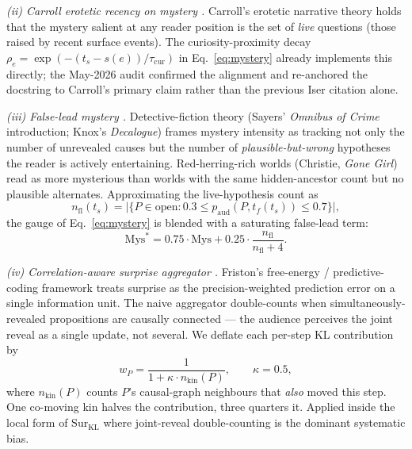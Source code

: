 \documentclass[11pt]{article}
\begin{document}
\emph{(ii) Carroll erotetic recency on mystery
\citep{carroll1990philosophy}.} Carroll's erotetic narrative
theory holds that the mystery salient at any reader position
is the set of \emph{live} questions (those raised by recent
surface events). The curiosity-proximity decay
$\rho_e = \exp(-(t_s - s(e))/\tau_{\mathrm{cur}})$ in
Eq.~\ref{eq:mystery} already implements this directly; the
May-2026 audit confirmed the alignment and re-anchored the
docstring to Carroll's primary claim rather than the previous
Iser citation alone.

\emph{(iii) False-lead mystery \citep{sayers1929omnibus,
knox1929decalogue}.} Detective-fiction theory (Sayers' \emph{Omnibus
of Crime} introduction; Knox's \emph{Decalogue}) frames mystery
intensity as tracking not only the number of unrevealed causes
but the number of \emph{plausible-but-wrong} hypotheses the
reader is actively entertaining. Red-herring-rich worlds
(Christie, \emph{Gone Girl}) read as more mysterious than worlds
with the same hidden-ancestor count but no plausible alternates.
Approximating the live-hypothesis count as
\begin{equation}
n_{\mathrm{fl}}(t_s) = \big|\{ P \in \mathrm{open} : 0.3 \le p_{\mathrm{aud}}(P, t_f(t_s)) \le 0.7 \}\big|,
\end{equation}
the gauge of Eq.~\ref{eq:mystery} is blended with a saturating
false-lead term:
\begin{equation}
\mathrm{Mys}^{*} = 0.75 \cdot \mathrm{Mys} + 0.25 \cdot \frac{n_{\mathrm{fl}}}{n_{\mathrm{fl}} + 4}.
\end{equation}

\emph{(iv) Correlation-aware surprise aggregator
\citep{friston2010freeenergy}.} Friston's free-energy /
predictive-coding framework treats surprise as the
precision-weighted prediction error on a single information
unit. The naive aggregator double-counts when simultaneously-
revealed propositions are causally connected --- the audience
perceives the joint reveal as a single update, not several. We
deflate each per-step KL contribution by
\begin{equation}
w_P = \frac{1}{1 + \kappa \cdot n_{\mathrm{kin}}(P)}, \qquad \kappa = 0.5,
\end{equation}
where $n_{\mathrm{kin}}(P)$ counts $P$'s causal-graph neighbours
that \emph{also} moved this step. One co-moving kin halves the
contribution, three quarters it. Applied inside the local form
of $\mathrm{Sur}_{\mathrm{KL}}$ where joint-reveal double-counting
is the dominant systematic bias.
\end{document}
